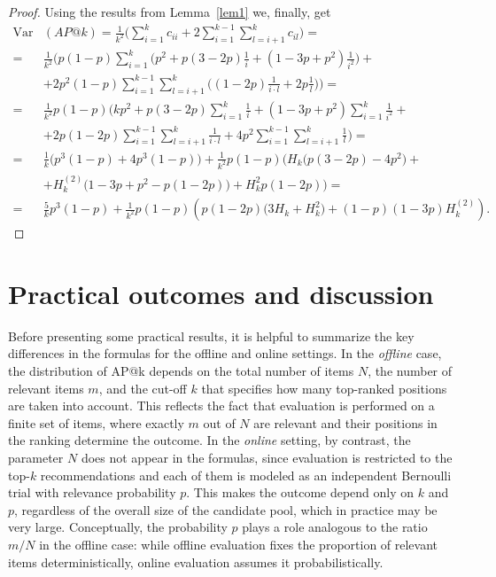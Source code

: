 \documentclass{tpms-l}
\theoremstyle{definition}
\theoremstyle{remark}
\numberwithin{equation}{section}
\begin{document}
\begin{proof}
Using the results from  Lemma~\ref{lem1} we, finally, get
\begin{equation*}
\begin{split}
\operatorname{Var}& (AP@k) = \frac{1}{k^2} \Bigg( \sum_{i=1}^{k}c_{ii} + 2\sum_{i=1}^{k-1}\sum_{l=i+1}^{k}c_{il} \Bigg) =
\\
= &\frac{1}{k^2} \Bigg( p(1-p) \sum_{i=1}^{k} \Big( p^2 + p(3-2p) \frac{1}{i} + (1-3p+p^2) \frac{1}{i^2} \Big) +
\\
&+ 2p^2(1-p) \sum_{i=1}^{k-1} \sum_{l=i+1}^{k} \Big( (1-2p) \frac{1}{i\cdot l} + 2p \frac{1}{l} \Big) \Bigg) =
\\
=& \frac{1}{k^2} p(1-p) \Bigg( k p^2 + p(3-2p) \sum_{i=1}^{k} \frac{1}{i} + (1-3p+p^2) \sum_{i=1}^{k} \frac{1}{i^2} + 
\\
&+ 2p(1-2p) \sum_{i=1}^{k-1} \sum_{l=i+1}^{k} \frac{1}{i \cdot l} + 4p^2 \sum_{i=1}^{k-1} \sum_{l=i+1}^{k} \frac{1}{l} \Bigg) =
\\
=&\frac{1}{k} \big( p^3(1-p) + 4p^3(1-p) \big) 
+ \frac{1}{k^2} p(1-p) \Big( H_k \big( p(3-2p) - 4p^2 \big) +
\\
& + H_k^{(2)} \big( 1 - 3p + p^2 - p(1 - 2p) \big) + H_k^2 p(1 - 2p) \Big) =
\\
=& \frac{5}{k}p^3(1-p)+\frac{1}{k^2}p(1-p)\left(p(1-2p)\big(3H_k+H_k^2\big)+(1-p)(1-3p)H_k^{(2)}\right).
\end{split}
\end{equation*} 
\end{proof}

\section{Practical outcomes and discussion} \label{sec5}
Before presenting some practical results, it is helpful to summarize the key differences in the formulas for the offline and online settings. In the \textit{offline} case, the distribution of AP@k depends on the total number of items $N$, the number of relevant items $m$, and the cut-off $k$ that specifies how many top-ranked positions are taken into account. This reflects the fact that evaluation is performed on a finite set of items, where exactly $m$ out of $N$ are relevant and their positions in the ranking determine the outcome. In the \textit{online} setting, by contrast, the parameter $N$ does not appear in the formulas, since evaluation is restricted to the top-$k$ recommendations and each of them is modeled as an independent Bernoulli trial with relevance probability $p$. This makes the outcome depend only on $k$ and $p$, regardless of the overall size of the candidate pool, which in practice may be very large. Conceptually, the probability $p$ plays a role analogous to the ratio $m/N$ in the offline case: while offline evaluation fixes the proportion of relevant items deterministically, online evaluation assumes it probabilistically.
\end{document}

